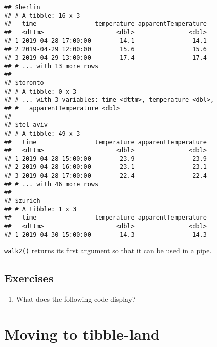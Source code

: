 \documentclass[]{book}
\newenvironment{Shaded}{\begin{snugshade}}{\end{snugshade}}
\newcommand{\DecValTok}[1]{\textcolor[rgb]{0.00,0.00,0.81}{#1}}
\newcommand{\KeywordTok}[1]{\textcolor[rgb]{0.13,0.29,0.53}{\textbf{#1}}}
\newcommand{\NormalTok}[1]{#1}
\newcommand{\OperatorTok}[1]{\textcolor[rgb]{0.81,0.36,0.00}{\textbf{#1}}}
\newcommand{\StringTok}[1]{\textcolor[rgb]{0.31,0.60,0.02}{#1}}
\begin{document}
\begin{verbatim}
## $berlin
## # A tibble: 16 x 3
##   time                temperature apparentTemperature
##   <dttm>                    <dbl>               <dbl>
## 1 2019-04-28 17:00:00        14.1                14.1
## 2 2019-04-29 12:00:00        15.6                15.6
## 3 2019-04-29 13:00:00        17.4                17.4
## # ... with 13 more rows
## 
## $toronto
## # A tibble: 0 x 3
## # ... with 3 variables: time <dttm>, temperature <dbl>,
## #   apparentTemperature <dbl>
## 
## $tel_aviv
## # A tibble: 49 x 3
##   time                temperature apparentTemperature
##   <dttm>                    <dbl>               <dbl>
## 1 2019-04-28 15:00:00        23.9                23.9
## 2 2019-04-28 16:00:00        23.1                23.1
## 3 2019-04-28 17:00:00        22.4                22.4
## # ... with 46 more rows
## 
## $zurich
## # A tibble: 1 x 3
##   time                temperature apparentTemperature
##   <dttm>                    <dbl>               <dbl>
## 1 2019-04-30 15:00:00        14.3                14.3
\end{verbatim}

\texttt{walk2()} returns its first argument so that it can be used in a pipe.

\hypertarget{exercises-13}{%
\subsection{Exercises}\label{exercises-13}}

\begin{enumerate}
\def\labelenumi{\arabic{enumi}.}
\item
  What does the following code display?

\begin{Shaded}
\end{Shaded}
\end{enumerate}

\hypertarget{mut_map}{%
\section{Moving to tibble-land}\label{mut_map}}
\end{document}
